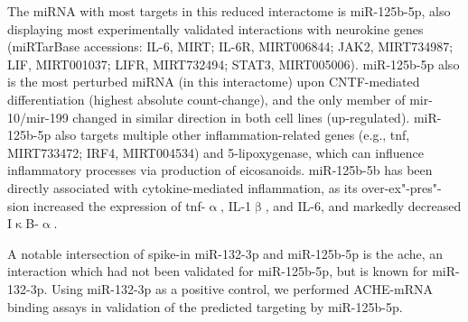 The miRNA with most targets in this reduced interactome is miR-125b-5p, also displaying most experimentally validated interactions with neurokine genes (miRTarBase accessions: IL-6, MIRT; IL-6R, MIRT006844; JAK2, MIRT734987; LIF, MIRT001037; LIFR, MIRT732494; \linebreak STAT3, MIRT005006). miR-125b-5p also is the most perturbed miRNA (in this interactome) upon CNTF-mediated differentiation (highest absolute count-change), and the only member of mir-10/mir-199 changed in similar direction in both cell lines (up-regulated). miR-125b-5p also targets multiple other inflammation-related genes (e.g., \ac{tnf}, MIRT733472; IRF4, MIRT004534) and 5-lipoxygenase, which can influence inflammatory processes via production of eicosanoids.\cite{Busch2015} miR-125b-5b has been directly associated with cytokine-mediated inflammation, as its over-ex"-pres"-sion increased the expression of \ac{tnf}-$\upalpha$, IL-1$\upbeta$, and IL-6, and markedly decreased I$\upkappa$B-$\upalpha$.\cite{Zhang2017}

A notable intersection of spike-in miR-132-3p and miR-125b-5p is the \ac{ache}, an interaction which had not been validated for miR-125b-5p, but is known for miR-132-3p.\cite{Shaked2009, Shaltiel2013} Using miR-132-3p as a positive control, we performed ACHE-mRNA binding assays in validation of the predicted targeting by miR-125b-5p.

